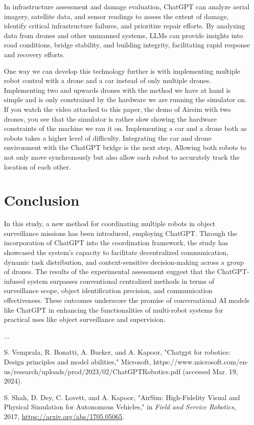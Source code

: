 \documentclass[journal]{IEEEtran}
\begin{document}
In infrastructure assessment and damage evaluation, ChatGPT can analyze aerial imagery, satellite data, and sensor readings to assess the extent of damage, identify critical infrastructure failures, and prioritize repair efforts. By analyzing data from drones and other unmanned systems, LLMs can provide insights into road conditions, bridge stability, and building integrity, facilitating rapid response and recovery efforts.

One way we can develop this technology further is with implementing multiple robot control with a drone and a car instead of only multiple drones. Implementing two and upwards drones with the method we have at hand is simple and is only constrained by the hardware we are running the simulator on. If you watch the video attached to this paper, the demo of Airsim with two drones, you see that the simulator is rather slow showing the hardware constraints of the machine we ran it on. Implementing a car and a drone both as robots takes a higher level of difficulty. Integrating the car and drone environment with the ChatGPT bridge is the next step, Allowing both robots to not only move synchronously but also allow each robot to accurately track the location of each other. 



\section{Conclusion}

In this study, a new method for coordinating multiple robots in object surveillance missions has been introduced, employing ChatGPT. Through the incorporation of ChatGPT into the coordination framework, the study has showcased the system's capacity to facilitate decentralized communication, dynamic task distribution, and context-sensitive decision-making across a group of drones. The results of the experimental assessment suggest that the ChatGPT-infused system surpasses conventional centralized methods in terms of surveillance scope, object identification precision, and communication effectiveness. These outcomes underscore the promise of conversational AI models like ChatGPT in enhancing the functionalities of multi-robot systems for practical uses like object surveillance and supervision.

...
\begin{thebibliography}{1}
S. Vemprala, R. Bonatti, A. Bucker, and A. Kapoor, "Chatgpt for robotics: Design principles and model abilities," Microsoft, https://www.microsoft.com/en-us/research/uploads/prod/2023/02/ChatGPTRobotics.pdf (accessed Mar. 19, 2024).

S. Shah, D. Dey, C. Lovett, and A. Kapoor, "AirSim: High-Fidelity Visual and Physical Simulation for Autonomous Vehicles," in \textit{Field and Service Robotics}, 2017, \url{https://arxiv.org/abs/1705.05065}.

\end{thebibliography}
\end{document}
